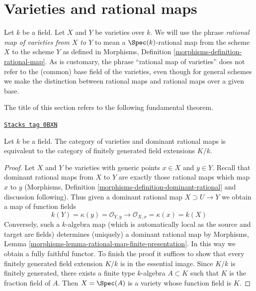 \section{Varieties and rational maps}
\label{varieties-section-varieties-rational-maps}
Let $k$ be a field. Let $X$ and $Y$ be varieties over $k$.
We will use the phrase {\it rational map of varieties from $X$ to $Y$}
to mean a $\Spec(k)$-rational map from the scheme $X$ to the scheme $Y$
as defined in Morphisms, Definition \ref{morphisms-definition-rational-map}.
As is customary, the phrase ``rational map of varieties''
does not refer to the (common) base field of the varieties,
even though for general schemes we make the distinction between
rational maps and rational maps over a given base.

\medskip\noindent
The title of this section refers to the following fundamental theorem.

\begin{theorem}
\label{varieties-theorem-varieties-rational-maps}
\href{https://stacks.math.columbia.edu/tag/0BXN}{\texttt{Stacks tag 0BXN}}

Let $k$ be a field. The category of varieties and
dominant rational maps is equivalent to the category of
finitely generated field extensions $K/k$.
\end{theorem}

\begin{proof}
Let $X$ and $Y$ be varieties with generic points $x \in X$ and $y \in Y$.
Recall that dominant rational maps from $X$ to $Y$ are exactly those
rational maps which map $x$ to $y$
(Morphisms, Definition \ref{morphisms-definition-dominant-rational}
and discussion following).
Thus given a dominant rational map $X \supset U \to Y$ we obtain a map of
function fields
$$
k(Y) = \kappa(y) = \mathcal{O}_{Y, y}
\longrightarrow
\mathcal{O}_{X, x} = \kappa(x) = k(X)
$$
Conversely, such a $k$-algebra map (which is automatically local as the
source and target are fields) determines (uniquely) a dominant rational
map by Morphisms, Lemma \ref{morphisms-lemma-rational-map-finite-presentation}.
In this way we obtain a fully faithful functor.
To finish the proof it suffices to show that every finitely generated
field extension $K/k$ is in the essential image.
Since $K/k$ is finitely generated, there exists a finite type
$k$-algebra $A \subset K$ such that $K$ is the fraction field of $A$.
Then $X = \Spec(A)$ is a variety whose function field is $K$.
\end{proof}

